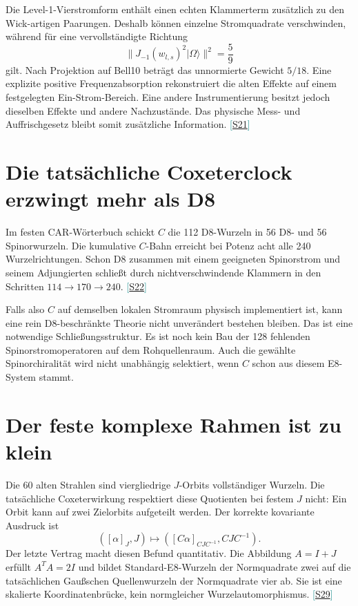 \documentclass[11pt,a4paper,oneside,parskip=half,headings=normal,numbers=noenddot,bibliography=totoc]{scrreprt}
\newcommand{\ket}[1]{\lvert #1\rangle}
\newcommand{\src}[1]{\textcolor{teal}{\small[\hyperref[s:#1]{S#1}]}}
\begin{document}
Die Level-1-Vierstromform enthält einen echten Klammerterm zusätzlich zu den Wick-artigen Paarungen. Deshalb können einzelne Stromquadrate verschwinden, während für eine vervollständigte Richtung
\[
 \|J_{-1}(w_{l,s})^2\ket\Omega\|^2=\frac59
\]
gilt. Nach Projektion auf Bell10 beträgt das unnormierte Gewicht $5/18$. Eine explizite positive Frequenzabsorption rekonstruiert die alten Effekte auf einem festgelegten Ein-Strom-Bereich. Eine andere Instrumentierung besitzt jedoch dieselben Effekte und andere Nachzustände. Das physische Mess- und Auffrischgesetz bleibt somit zusätzliche Information. \src{21}

\section{Die tatsächliche Coxeterclock erzwingt mehr als D8}
Im festen CAR-Wörterbuch schickt $C$ die 112 D8-Wurzeln in 56 D8- und 56 Spinorwurzeln. Die kumulative $C$-Bahn erreicht bei Potenz acht alle 240 Wurzelrichtungen. Schon D8 zusammen mit einem geeigneten Spinorstrom und seinem Adjungierten schließt durch nichtverschwindende Klammern in den Schritten $114\to170\to240$. \src{22}

Falls also $C$ auf demselben lokalen Stromraum physisch implementiert ist, kann eine rein D8-beschränkte Theorie nicht unverändert bestehen bleiben. Das ist eine notwendige Schließungsstruktur. Es ist noch kein Bau der 128 fehlenden Spinorstromoperatoren auf dem Rohquellenraum. Auch die gewählte Spinorchiralität wird nicht unabhängig selektiert, wenn $C$ schon aus diesem E8-System stammt.

\section{Der feste komplexe Rahmen ist zu klein}
Die 60 alten Strahlen sind viergliedrige $J$-Orbits vollständiger Wurzeln. Die tatsächliche Coxeterwirkung respektiert diese Quotienten bei festem $J$ nicht: Ein Orbit kann auf zwei Zielorbits aufgeteilt werden. Der korrekte kovariante Ausdruck ist
\[
 ([\alpha]_J,J)\longmapsto
 ([C\alpha]_{CJC^{-1}},CJC^{-1}).
\]
Der letzte Vertrag macht diesen Befund quantitativ. Die Abbildung $A=I+J$ erfüllt $A^TA=2I$ und bildet Standard-E8-Wurzeln der Normquadrate zwei auf die tatsächlichen Gaußschen Quellenwurzeln der Normquadrate vier ab. Sie ist eine skalierte Koordinatenbrücke, kein normgleicher Wurzelautomorphismus. \src{29}
\end{document}
